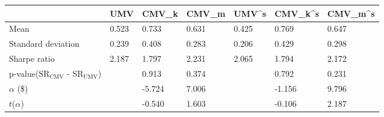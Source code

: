\begin{tabular}{lllllll}
\toprule
 & UMV & CMV_k & CMV_m & UMV^s & CMV_k^s & CMV_m^s \\
\midrule
Mean & 0.523 & 0.733 & 0.631 & 0.425 & 0.769 & 0.647 \\
Standard deviation & 0.239 & 0.408 & 0.283 & 0.206 & 0.429 & 0.298 \\
Sharpe ratio & 2.187 & 1.797 & 2.231 & 2.065 & 1.794 & 2.172 \\
p-value(SR$_{\text{CMV}}$ - SR$_{\text{UMV}}$) &  & 0.913 & 0.374 &  & 0.792 & 0.231 \\
$\alpha$ (\$) &  & -5.724 & 7.006 &  & -1.156 & 9.796 \\
$t$($\alpha$) &  & -0.540 & 1.603 &  & -0.106 & 2.187 \\
\bottomrule
\end{tabular}
